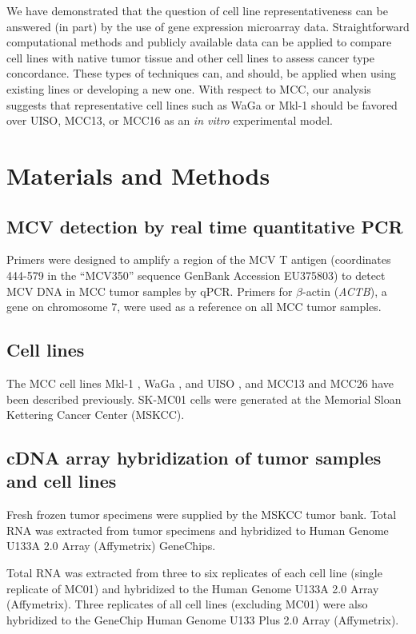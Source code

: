 \documentclass[10pt]{article}
\begin{document}
We have demonstrated that the question of cell line representativeness can be answered (in part) by the use of gene expression microarray data.
Straightforward computational methods and publicly available data can be applied to compare cell lines with native tumor tissue and other cell lines to assess cancer type concordance.
These types of techniques can, and should, be applied when using existing lines or developing a new one.
With respect to MCC, our analysis suggests that representative cell lines such as WaGa or Mkl-1 should be favored over UISO, MCC13, or MCC16 as an \emph{in vitro} experimental model.

\section*{Materials and Methods}

\subsection*{MCV detection by real time quantitative PCR}

Primers were designed to amplify a region of the MCV T antigen (coordinates 444-579 in the ``MCV350'' sequence GenBank Accession EU375803) to detect MCV DNA in MCC tumor samples by qPCR.
Primers for $\beta$-actin (\emph{ACTB}), a gene on chromosome 7, were used as a reference on all MCC tumor samples.

\subsection*{Cell lines}
The MCC cell lines Mkl-1 \citep{Rosen1987Establishment}, WaGa \citep{Houben2010Merkel}, and UISO \citep{Ronan1993Merkel}, and MCC13 and MCC26 \citep{Leonard1995Characterisation} have been described previously.
SK-MC01 cells were generated at the Memorial Sloan Kettering Cancer Center (MSKCC).

\subsection*{cDNA array hybridization of tumor samples and cell lines}
Fresh frozen tumor specimens were supplied by the MSKCC tumor bank.
Total RNA was extracted from tumor specimens and hybridized to Human Genome U133A 2.0 Array (Affymetrix) GeneChips.

Total RNA was extracted from three to six replicates of each cell line (single replicate of MC01) and hybridized to the Human Genome U133A 2.0 Array (Affymetrix).
Three replicates of all cell lines (excluding MC01) were also hybridized to the GeneChip Human Genome U133 Plus 2.0 Array (Affymetrix).
\end{document}
